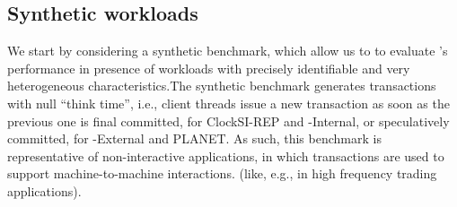 

\subsection{Synthetic workloads}
We start by considering a synthetic benchmark, which allow us to to evaluate \specula's performance in presence of workloads with precisely identifiable and very heterogeneous characteristics.The synthetic benchmark generates transactions with null ``think time'', i.e., client threads issue a new transaction as soon as the previous one is final committed, for ClockSI-REP and {\specula}-Internal, or speculatively committed, for {\specula}-External and PLANET. As such, this benchmark is representative of non-interactive applications, in which transactions are used to support machine-to-machine interactions. (like, e.g., in high frequency trading applications).


